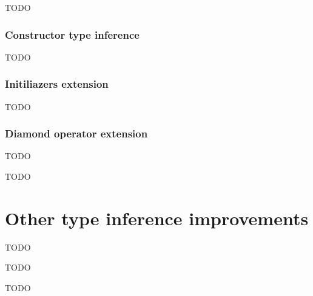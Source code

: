 TODO

\subsubsection*{Constructor type inference}

TODO

\subsubsection*{Initiliazers extension}

TODO

\subsubsection*{Diamond operator extension}

TODO


TODO

\section{Other type inference improvements}

TODO


TODO


TODO